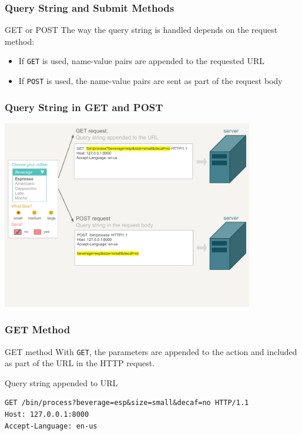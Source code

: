 \documentclass{beamer}\usepackage[]{graphicx}\usepackage[]{color}
\newcommand{\code}[1]{\texttt{#1}}
\begin{document}

\begin{frame}
\frametitle{Query String and Submit Methods}

\begin{block}{GET or POST}
The way the query string is handled depends on the request method:

\begin{itemize}
 \item If \code{GET} is used, name-value pairs are appended to the requested URL
 \item If \code{POST} is used, the name-value pairs are sent as part of the request body
\end{itemize}
\end{block}

\end{frame}


\begin{frame}[fragile]
\frametitle{Query String in GET and POST}

\begin{center}
\includegraphics[width=11cm]{images/html_form_get_post.pdf}
\end{center}

\end{frame}


\begin{frame}[fragile]
\frametitle{GET Method}

\begin{block}{GET method}
With \code{GET}, the parameters are appended to the action and included as part of the URL in the HTTP request.
\end{block}

\begin{block}{Query string appended to URL}
{\footnotesize
\begin{verbatim}
GET /bin/process?beverage=esp&size=small&decaf=no HTTP/1.1
Host: 127.0.0.1:8000
Accept-Language: en-us
\end{verbatim}
}
\end{block}

\end{frame}
\end{document}
